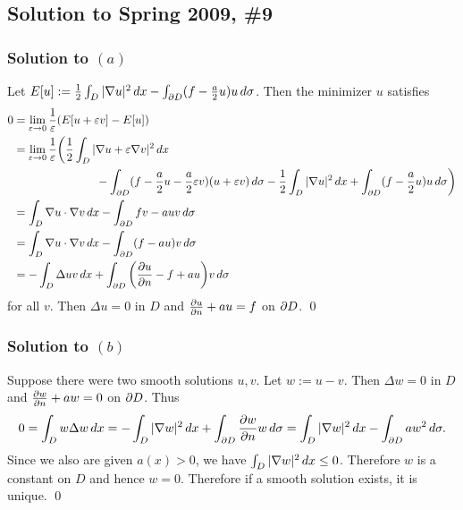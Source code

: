 \subsection*{Solution to Spring 2009, \#9}\label{s099}
\subsubsection*{Solution to $(a)$}
Let $E[u] := \frac{1}{2}\int_{D}|\nabla u|^{2}\, dx - \int_{\partial D}(f - \frac{a}{2}u)u\, d\sigma$. Then the minimizer $u$ satisfies
\begin{align*}
0 & = \lim_{\varepsilon \rightarrow 0}\frac{1}{\varepsilon}(E[u + \varepsilon v] - E[u])\\
&= \lim_{\varepsilon \rightarrow 0}\frac{1}{\varepsilon}\bigg(\frac{1}{2}\int_{D}|\nabla u + \varepsilon \nabla v|^{2}\, dx \\
&\hspace{1in}- \int_{\partial D}(f - \frac{a}{2}u - \frac{a}{2}\varepsilon v)(u + \varepsilon v)\, d\sigma - \frac{1}{2}\int_{D}|\nabla u|^{2}\, dx + \int_{\partial D}(f - \frac{a}{2}u)u\, d\sigma\bigg)\\
&= \int_{D}\nabla u \cdot \nabla v\, dx - \int_{\partial D}fv - auv\, d\sigma\\
&= \int_{D}\nabla u \cdot \nabla v\, dx - \int_{\partial D}(f - au)v\, d\sigma\\
&= -\int_{D}\Delta u v\, dx + \int_{\partial D}\bigg(\frac{\partial u}{\partial n} - f + au\bigg)v\, d\sigma
\end{align*}
for all $v$. Then $\Delta u = 0$ in $D$ and $\frac{\partial u}{\partial n} + au = f$ on $\partial D$.
\hfill\qed

\subsubsection*{Solution to $(b)$}
Suppose there were two smooth solutions $u, v$. Let $w:= u - v$. Then
$\Delta w = 0$ in $D$ and $\frac{\partial w}{\partial n} + aw = 0$ on $\partial D$. Thus
\begin{align*}
0 = \int_{D}w\Delta w\, dx = -\int_{D}|\nabla w|^{2}\, dx + \int_{\partial D}\frac{\partial w}{\partial n}w\, d\sigma = \int_{D}|\nabla w|^{2}\, dx - \int_{\partial D}aw^{2}\, d\sigma.
\end{align*}
Since we also are given $a(x) > 0$, we have $\int_{D}|\nabla w|^{2}\, dx \leq 0$. Therefore $w$ is a constant on $D$ and hence $w = 0$. Therefore if a smooth solution exists,
it is unique.
\hfill\qed
